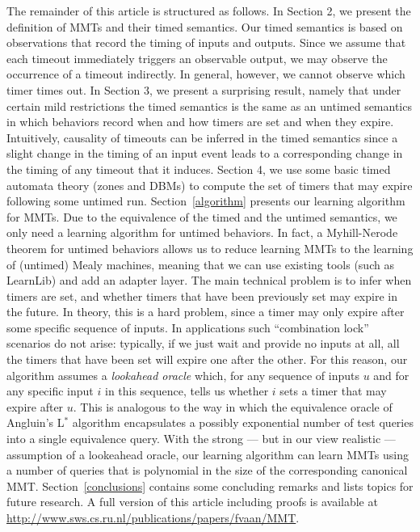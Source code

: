 The remainder of this article is structured as follows.
In Section 2, we present the definition of MMTs and their timed semantics.
Our timed semantics is based on observations that record the timing of inputs and outputs. 
Since we assume that each timeout immediately triggers an observable output, we may observe
the occurrence of a timeout indirectly. In general, however, we cannot observe which timer times out.
In Section 3, we present a surprising result, namely that under certain mild restrictions the timed semantics
is the same as an untimed semantics in which behaviors record when and how timers are set and when they expire.
Intuitively, causality of timeouts can be inferred in the timed semantics since a slight change in the timing of an input event leads to a corresponding change in the timing of any timeout that it induces.
\iflong
Section 4, we use some basic timed automata theory (zones and DBMs) to compute the set of timers that may expire  following some untimed run.
\fi
Section~\ref{algorithm} presents our learning algorithm for MMTs. 
Due to the equivalence of the timed and the untimed semantics, we only need a learning algorithm for untimed behaviors.
In fact, a Myhill-Nerode theorem for untimed behaviors allows us to reduce learning MMTs
to the learning of (untimed) Mealy machines, meaning that we can use existing tools (such as LearnLib) and add an adapter layer.
The main technical problem is to infer when timers are set, and whether timers that have been previously set may expire
in the future.
In theory, this is a hard problem, since a timer may only expire after some specific sequence of inputs.
In applications such ``combination lock'' scenarios do not arise: typically, if we just wait and provide no inputs at all,
all the timers that have been set will expire one after the other.
For this reason, our algorithm assumes a \emph{lookahead oracle} which, for any sequence of inputs $u$ and for any specific input
$i$ in this sequence, tells us whether $i$ sets a timer that may expire after $u$.
This is analogous to the way in which the equivalence oracle 
of Angluin's L$^{\ast}$ algorithm \cite{Ang87} encapsulates a possibly exponential number of test queries into
a single equivalence query.
With the strong --- but in our view realistic --- assumption of a lookeahead oracle, our learning algorithm can learn MMTs
using a number of queries that is polynomial in the size of the corresponding canonical MMT.
Section~\ref{conclusions} contains some concluding remarks and lists topics for future research.
\ifshort
A full version of this article including proofs is available at \url{http://www.sws.cs.ru.nl/publications/papers/fvaan/MMT}.
\fi

